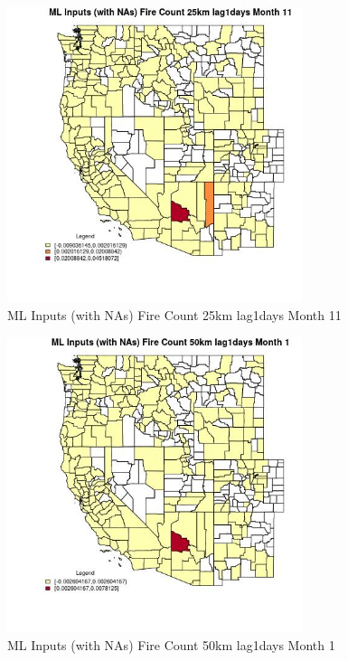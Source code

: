 \begin{figure} 
\centering  
\includegraphics[width=0.77\textwidth]{Code_Outputs/Report_ML_input_PM25_Step4_part_e_de_duplicated_aves_compiled_2019-05-20wNAs_CountyFire_Count_25km_lag1daysmedianMonth11.jpg} 
\caption{\label{fig:Report_ML_input_PM25_Step4_part_e_de_duplicated_aves_compiled_2019-05-20wNAsCountyFire_Count_25km_lag1daysmedianMonth11}ML Inputs (with NAs) Fire Count 25km lag1days Month 11} 
\end{figure} 
 

\clearpage 

\begin{figure} 
\centering  
\includegraphics[width=0.77\textwidth]{Code_Outputs/Report_ML_input_PM25_Step4_part_e_de_duplicated_aves_compiled_2019-05-20wNAs_CountyFire_Count_50km_lag1daysmedianMonth1.jpg} 
\caption{\label{fig:Report_ML_input_PM25_Step4_part_e_de_duplicated_aves_compiled_2019-05-20wNAsCountyFire_Count_50km_lag1daysmedianMonth1}ML Inputs (with NAs) Fire Count 50km lag1days Month 1} 
\end{figure} 
 

